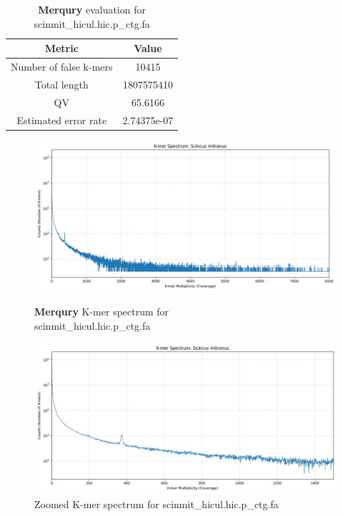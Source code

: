 \documentclass[12pt]{article}
\begin{document}
\begin{table}[h!]
    \begin{center}
    \begin{tabular}{ |c|c| }
        \hline
        Metric & Value \\
        \hline
        Number of false k-mers & 10415 \\
        Total length & 1807575410 \\
        QV & 65.6166 \\
        Estimated error rate & 2.74375e-07 \\
        \hline
    \end{tabular}
    \caption{\textbf{Merqury} evaluation for scinmit\_hicul.hic.p\_ctg.fa}
    \label{tab:merqury_scinmit_hicul}
    \end{center}
    \end{table}

\begin{figure}[h!]
    \centering
    \begin{minipage}[t]{0.48\textwidth}
        \centering
        \includegraphics[width=\textwidth]{k_mer_spectrum.png}
        \caption{\textbf{Merqury} K-mer spectrum for \\ scinmit\_hicul.hic.p\_ctg.fa}
        \label{fig:k_mer_spectrum}
    \end{minipage}
    \hfill
    \begin{minipage}[t]{0.48\textwidth}
        \centering
        \includegraphics[width=\textwidth]{k_mer_spectrum_zoomed.png}
        \caption{Zoomed K-mer spectrum for scinmit\_hicul.hic.p\_ctg.fa}
        \label{fig:k_mer_spectrum_zoom}
    \end{minipage}
\end{figure}
\end{document}
